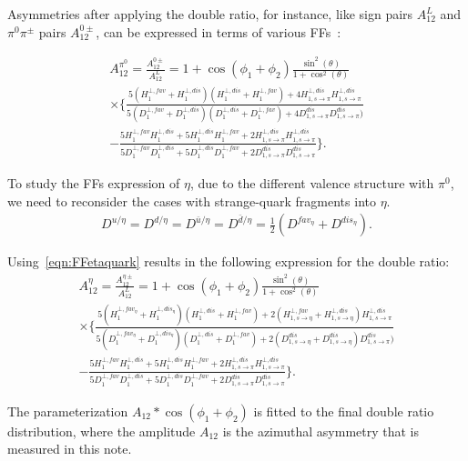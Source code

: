 Asymmetries after applying the double ratio, for instance, like sign pairs $A^L_{12}$ and $\pi^0\pi^{\pm}$ pairs $A^{0\pm}_{12}$, can be expressed in terms of various FFs~\cite{Efremov:2006qm}:

\begin{multline}
A_{12}^{\pi^0}=\frac{A^{0\pm}_{12}}{A^L_{12}}=1+\cos(\phi_1+\phi_2)\frac{\sin^2(\theta)}{1+\cos^2(\theta)} \\
\times\bigg\{\frac{5(H^{\bot,fav}_1+H^{\bot,dis}_1)(H^{\bot,dis}_1+H^{\bot,fav}_1)+4H^{\bot,dis}_{1,s\rightarrow\pi}H^{\bot,dis}_{1,s\rightarrow\pi}}{5(D^{\bot,fav}_1+D^{\bot,dis}_1)(D^{\bot,dis}_1+D^{\bot,fav}_1)+4D^{dis}_{1,s\rightarrow\pi}D^{dis}_{1,s\rightarrow\pi})}\\
-\frac{5H^{\bot,fav}_1H^{\bot,dis}_1+5H^{\bot,dis}_1H^{\bot,fav}_1+2H^{\bot,dis}_{1,s\rightarrow\pi}H^{\bot,dis}_{1,s\rightarrow\pi}}{5D^{\bot,fav}_1D^{\bot,dis}_1+5D^{\bot,dis}_1D^{\bot,fav}_1+2D^{dis}_{1,s\rightarrow\pi}D^{dis}_{1,s\rightarrow\pi}} \bigg\}.
\label{eqn:FF5}
\end{multline}

To study the FFs expression of $\eta$, due to the different valence structure with $\pi^0$, we need to reconsider the cases with strange-quark fragments into $\eta$. 
\begin{equation}
\begin{aligned}
D^{u/{\eta}}=D^{d/{\eta}}=D^{\bar{u}/{\eta}}=D^{\bar{d}/{\eta}}=\frac{1}{2}\left(D^{fav_\eta}+D^{dis_\eta}\right).
\label{eqn:FFetaquark}
\end{aligned}
\end{equation}

Using~\ref{eqn:FFetaquark} results in the following expression for the double ratio:
\begin{multline}
A_{12}^{\eta}=\frac{A^{\eta\pm}_{12}}{A^L_{12}}=1+\cos(\phi_1+\phi_2)\frac{\sin^2(\theta)}{1+\cos^2(\theta)} \\
\times\bigg\{\frac{5(H^{\bot,fav_\eta}_1+H^{\bot,dis_\eta}_1)(H^{\bot,dis}_1+H^{\bot,fav}_1)+2(H^{\bot,fav}_{1,s\rightarrow\eta}+H^{\bot,dis}_{1,s\rightarrow\eta})H^{\bot,dis}_{1,s\rightarrow\pi}}{5(D^{\bot,fav_\eta}_1+D^{\bot,dis_\eta}_1)(D^{\bot,dis}_1+D^{\bot,fav}_1)+2(D^{dis}_{1,s\rightarrow\eta}+D^{dis}_{1,s\rightarrow\eta})D^{dis}_{1,s\rightarrow\pi})}\\
-\frac{5H^{\bot,fav}_1H^{\bot,dis}_1+5H^{\bot,dis}_1H^{\bot,fav}_1+2H^{\bot,dis}_{1,s\rightarrow\pi}H^{\bot,dis}_{1,s\rightarrow\pi}}{5D^{\bot,fav}_1D^{\bot,dis}_1+5D^{\bot,dis}_1D^{\bot,fav}_1+2D^{dis}_{1,s\rightarrow\pi}D^{dis}_{1,s\rightarrow\pi}} \bigg\}.
\label{eqn:FF5eta}
\end{multline}

The parameterization $A_{12}*\cos(\phi_1+\phi_2)$ is fitted to the final double ratio distribution, where the amplitude $A_{12}$ is the azimuthal asymmetry that is measured in this note. 